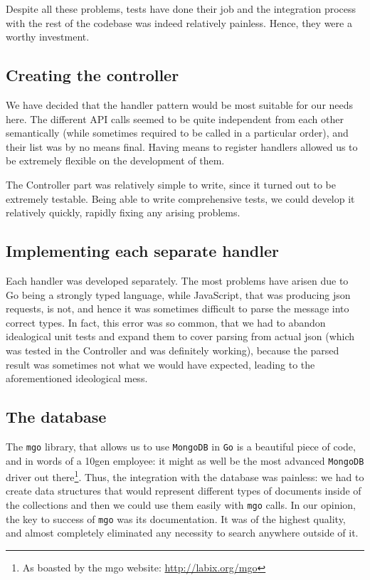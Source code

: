 \documentclass{l3proj}
\begin{document}
Despite all these problems, tests have done their job and the integration process with the rest of the codebase was indeed relatively painless. Hence, they were  a worthy investment.

\subsection{Creating the controller}

We have decided that the handler pattern would be most suitable for our needs here. The different API calls seemed to be quite independent from each other semantically (while sometimes required to be called in a particular order), and their list was by no means final. Having means to register handlers allowed us to be extremely flexible on the development of them.

The Controller part was relatively simple to write, since it turned out to be extremely testable. Being able to write comprehensive tests, we could develop it relatively quickly, rapidly fixing any arising problems. 

\subsection{Implementing each separate handler}

Each handler was developed separately. The most problems have arisen due to Go being a strongly typed language, while JavaScript, that was producing json requests, is not, and hence it was sometimes difficult to parse the message into correct types. In fact, this error was so common, that we had to abandon idealogical unit tests and expand them to cover parsing from actual json (which was tested in the Controller and was definitely working), because the parsed result was sometimes not what we would have expected, leading to the aforementioned ideological mess.

\subsection{The database}

The \texttt{mgo} library, that allows us to use \texttt{MongoDB} in \texttt{Go} is a beautiful piece of code, and in words of a 10gen employee: it might as well be the most advanced \texttt{MongoDB} driver out there\footnote{\raggedright{}As boasted by the mgo website: \url{http://labix.org/mgo}}. Thus, the integration with the database was painless: we had to create data structures that would represent different types of documents inside of the collections and then we could use them easily with \texttt{mgo} calls. In our opinion, the key to success of \texttt{mgo} was its documentation. It was of the highest quality, and almost completely eliminated any necessity to search anywhere outside of it.
\end{document}
